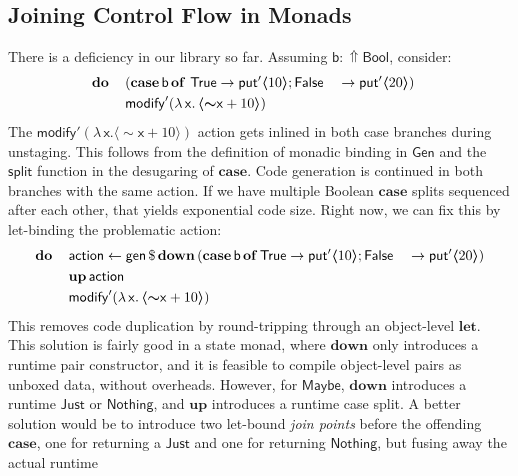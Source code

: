 \documentclass[acmsmall,screen,review,anonymous]{acmart}
\newcommand{\mit}[1]{{\mathsf{#1}}}
\newcommand{\msf}[1]{{\mathsf{#1}}}
\newcommand{\mbf}[1]{{\mathbf{#1}}}
\newcommand{\bs}[1]{\boldsymbol{#1}}
\newcommand{\mdo}{\mbf{do}\,}
\newcommand{\lam}{\lambda\,}
\newcommand{\of}{\mbf{of}\,}
\newcommand{\vb}{\mathsf{b}}
\newcommand{\vx}{\mathsf{x}}
\newcommand{\Bool}{\msf{Bool}}
\newcommand{\fro}{\leftarrow}
\newcommand{\case}{\mbf{case\,}}
\newcommand{\Up}{{\Uparrow}}
\newcommand{\spl}{{\bs{\sim}}}
\newcommand{\ql}{{\bs{\langle}}}
\newcommand{\qr}{{\bs{\rangle}}}
\newcommand{\bind}{\mathbin{>\!\!>\mkern-6.7mu=}}
\newcommand{\True}{\msf{True}}
\newcommand{\False}{\msf{False}}
\newcommand{\Maybe}{\msf{Maybe}}
\newcommand{\Nothing}{\msf{Nothing}}
\newcommand{\Just}{\msf{Just}}
\theoremstyle{remark}
\newcommand{\mup}{\mbf{up}}
\newcommand{\mdown}{\mbf{down}}
\newcommand{\Gen}{\msf{Gen}}
\newcommand{\gen}{\mit{gen}}
\newcommand{\qt}[1]{\ql#1\qr}
\newcommand{\dlr}{\,\$\,}
\newcommand{\modify}{\mit{modify}}
\newcommand{\mput}{\mit{put}}
\begin{document}
\subsection{Joining Control Flow in Monads}\label{sec:joining-control-flow-in-monads}

There is a deficiency in our library so far. Assuming $\vb : \Up\Bool$, consider:
\begin{alignat*}{5}
  & \hspace{-1em}\mdo && (\case \vb\,\of\,\True\to \mput' \qt{10}; \False &&\to \mput' \qt{20})\\
  & \hspace{-1em}     && \mathrlap{\modify' (\lam \vx.\,\qt{\spl \vx + 10})}
\end{alignat*}
The $\modify' (\lam \vx. \qt{\spl \vx + 10})$ action gets inlined in both case
branches during unstaging. This follows from the definition of monadic binding in
$\Gen$ and the $\mit{split}$ function in the desugaring of $\mbf{case}$. Code
generation is continued in both branches with the same action. If we have
multiple Boolean $\mbf{case}$ splits sequenced after each other, that yields
exponential code size. Right now, we can fix this by let-binding the problematic
action:
\begin{alignat*}{5}
  & \mdo && \msf{action} \fro \gen \dlr \mdown\,(\case \vb\,\of \True \to \mput' \qt{10};\False &&\to \mput' \qt{20}) \\
  &      && \mup\,\msf{action}\\
  &      && \mathrlap{\modify' (\lam \vx.\,\qt{\spl \vx + 10})}
\end{alignat*}
This removes code duplication by round-tripping through an object-level
$\mbf{let}$. This solution is fairly good in a state monad, where $\mdown$ only
introduces a runtime pair constructor, and it is feasible to compile
object-level pairs as unboxed data, without overheads. However, for $\Maybe$,
$\mdown$ introduces a runtime $\Just$ or $\Nothing$, and $\mup$ introduces a
runtime case split. A better solution would be to introduce two let-bound
\emph{join points} before the offending $\mbf{case}$, one for returning a
$\Just$ and one for returning $\Nothing$, but fusing away the actual runtime
\end{document}
